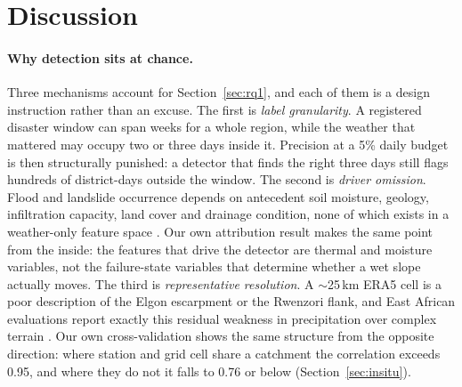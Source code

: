 \documentclass[preprint,12pt]{elsarticle}
\begin{document}
\section{Discussion}\label{sec:discussion}

\paragraph{Why detection sits at chance.} Three mechanisms account for
Section~\ref{sec:rq1}, and each of them is a design instruction rather than an
excuse. The first is \emph{label granularity}. A registered disaster window can
span weeks for a whole region, while the weather that mattered may occupy two or
three days inside it. Precision at a 5\% daily budget is then structurally
punished: a detector that finds the right three days still flags hundreds of
district-days outside the window. The second is \emph{driver omission}. Flood and
landslide occurrence depends on antecedent soil moisture, geology, infiltration
capacity, land cover and drainage condition, none of which exists in a
weather-only feature space \cite{mugagga2012,namwano2026}. Our own attribution
result makes the same point from the inside: the features that drive the
detector are thermal and moisture variables, not the failure-state variables
that determine whether a wet slope actually moves. The third is
\emph{representative resolution}. A
$\sim$25\,km ERA5 cell is a poor description of the Elgon escarpment or the
Rwenzori flank, and East African evaluations report exactly this residual
weakness in precipitation over complex terrain \cite{gleixner2020}. Our own
cross-validation shows the same structure from the opposite direction: where
station and grid cell share a catchment the correlation exceeds 0.95, and where
they do not it falls to 0.76 or below (Section~\ref{sec:insitu}).
\end{document}
